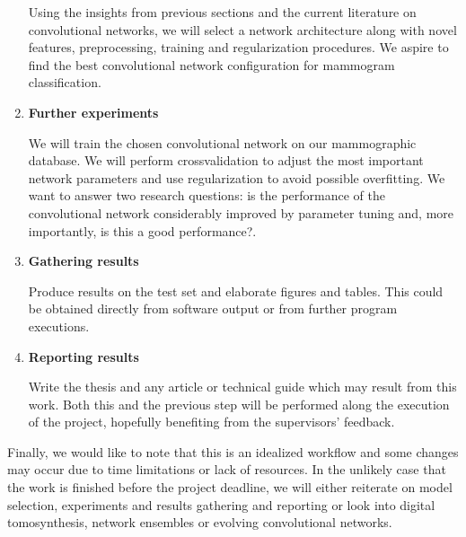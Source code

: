 \begin{enumerate}
Using the insights from previous sections and the current literature on convolutional networks, we will select a network architecture along with novel features, preprocessing, training and regularization procedures. We aspire to find the best convolutional network configuration for mammogram classification.
	\item \textbf{Further experiments}

We will train the chosen convolutional network on our mammographic database. We will perform crossvalidation to adjust the most important network parameters and use regularization to avoid possible overfitting. We want to answer two research questions: is the performance of the convolutional network considerably improved by parameter tuning and, more importantly, is this a good performance?.
	\item \textbf{Gathering results}

Produce results on the test set and elaborate figures and tables. This could be obtained directly from software output or from further program executions.
	\item \textbf{Reporting results}

Write the thesis and any article or technical guide which may result from this work. Both this and the previous step will be performed along the execution of the project, hopefully benefiting from the supervisors' feedback.
\end{enumerate}
Finally, we would like to note that this is an idealized workflow and some changes may occur due to time limitations or lack of resources. In the unlikely case that the work is finished before the project deadline, we will either reiterate on model selection, experiments and results gathering and reporting or look into digital tomosynthesis, network ensembles or evolving convolutional networks.

\begin{comment}
La {\it Metodología} (o lo que algunos autores llaman el {\it Método})
 es el proceso o
conjunto de pasos que debe efectuarse para llegar a cumplir con los
objetivos. Esos pasos deben contener  los experimentos a realizar, la forma de
llevarlos a cabo, la evaluación de los resultados, la prueba de las hipótesis,
la respuesta a las preguntas de investigación y el último paso debe ser el
reporte escrito de los resultados.
\end{comment}
